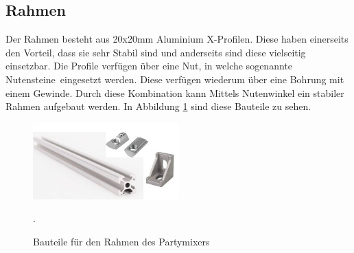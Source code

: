 \subsection{Rahmen}
\label{subsec:Rahmen}

Der Rahmen besteht aus 20x20mm Aluminium X-Profilen. Diese haben einerseits den Vorteil, dass sie sehr Stabil sind und anderseits sind diese vielseitig einsetzbar. Die Profile verfügen über eine Nut, in welche sogenannte \flqq Nutensteine\frqq~eingesetzt werden. Diese verfügen wiederum über eine Bohrung mit einem Gewinde. Durch diese Kombination kann Mittels Nutenwinkel ein stabiler Rahmen aufgebaut werden. In Abbildung \ref{fig:Rahmen} sind diese Bauteile zu sehen.  

\begin{figure}[H]
	\centering
	\includegraphics[width=0.5\textwidth]{graphics/Rahmen}
	\caption{Bauteile für den Rahmen des Partymixers}.
	\label{fig:Rahmen}
\end{figure}